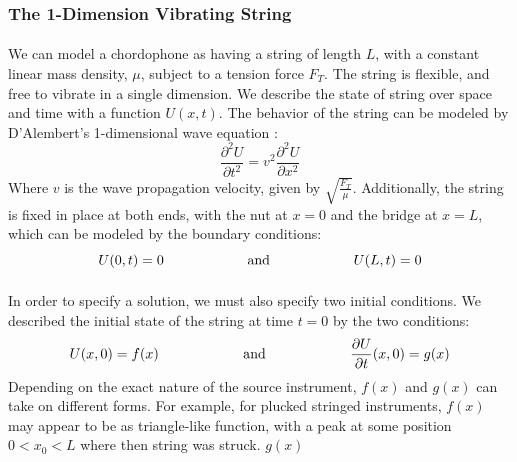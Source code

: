 \documentclass[12pt,letterpaper]{article}
\begin{document}
\subsubsection{The 1-Dimension Vibrating String}

\paragraph*{}We can model a chordophone as having a string of length $L$, with a constant linear mass density, $\mu$, subject to a tension force $F_T$. The string is flexible, and free to vibrate in a single dimension. We describe the state of string over space and time with a function $U(x,t)$. The behavior of the string can be  modeled by D'Alembert's 1-dimensional wave equation \cite{Haberman,Taylor}:
\begin{equation}
\label{eqn-1DWaveEqn}
\frac{\partial^2 U}{\partial t^2} = v^2 \frac{\partial^2 U}{\partial x^2}
\end{equation}
Where $v$ is the wave propagation velocity, given by $\sqrt{\frac{F_T}{\mu}}$. Additionally, the string is fixed in place at both ends, with the nut at $x = 0$ and the bridge at $x = L$, which can be modeled by the boundary conditions:
\begin{equation}
U(0,t) = 0 
	\text{\hspace*{2cm} and \hspace*{2cm}}
U(L,t) = 0 
\end{equation}

\paragraph*{}In order to specify a solution, we must also specify two initial conditions. We described the initial state of the string at time $t = 0$  by the two conditions:
\begin{equation}
U(x,0) = f(x) 
	\text{\hspace*{2cm} and \hspace*{2cm}}
\frac{\partial U}{\partial t}(x,0) = g(x)
\end{equation}
Depending on the exact nature of the source instrument, $f(x)$ and $g(x)$ can take on different forms. For example, for plucked stringed instruments, $f(x)$ may appear to be as triangle-like function, with a peak at some position $0 < x_0 < L$ where then string was struck. $g(x)$
\end{document}
